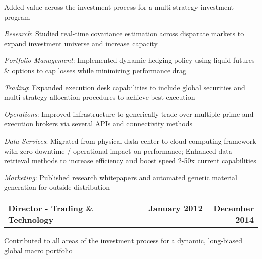 \documentclass[letterpaper]{article}
\begin{document}
    \begin{list}{}{\leftmargin=0em}
      \item Added value across the investment process for a multi-strategy
        investment program
    \end{list}
    \begin{list}{}{\leftmargin=1em}
      \item \textit{Research}: Studied real-time covariance estimation across
        disparate markets to expand investment universe and increase capacity
      \item \textit{Portfolio Management}: Implemented dynamic hedging policy using
        liquid futures \& options to cap losses while minimizing performance drag
      \item \textit{Trading}: Expanded execution desk capabilities to include
        global securities and multi-strategy allocation procedures to achieve
        best execution
      \item \textit{Operations}: Improved infrastructure to generically trade over
        multiple prime and execution brokers via several APIs and connectivity methods
      \item \textit{Data Services}: Migrated from physical data center to cloud
        computing framework with zero downtime / operational impact on performance;
        Enhanced data retrieval methods to increase efficiency and boost speed
        2-50x current capabilities
      \item \textit{Marketing}: Published research whitepapers and automated
        generic material generation for outside distribution 
    \end{list}
  \begin{tabular*}{7.5in}{@{\extracolsep{\fill}}lr}
    \textbf{Director - Trading \& Technology} & \textbf{January 2012 -- December 2014}
  \end{tabular*}
    \begin{list}{}{\leftmargin=0em}
      \item Contributed to all areas of the investment process for a dynamic, long-biased
        global macro portfolio
    \end{list}
\end{document}
